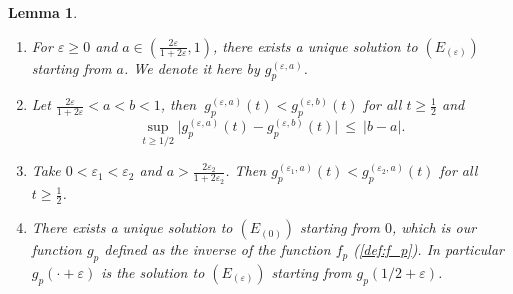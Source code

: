 \documentclass[a4, 11pt]{article}
\numberwithin{equation}{section}
\theoremstyle{plain}
\newtheorem{lemma}[theorem]{Lemma}
\theoremstyle{definition}
\theoremstyle{remark}
\begin{document}
\begin{lemma}\label{lm:equadiff}
\begin{enumerate}[topsep=0cm]
\item[\emph{1)}] For $\varepsilon \geq 0$ and $a\in \left(\frac{2\varepsilon}{1+2\varepsilon},1\right)$,  there exists a unique solution to $(E_{(\varepsilon)})$ starting from $a$. We denote it here by $g_p^{(\varepsilon,a)}$.
\item[\emph{2)}] Let $\frac{2\varepsilon}{1+2\varepsilon}<a<b<1$, then $~g_p^{(\varepsilon,a)}(t)<g_p^{(\varepsilon,b)}(t)$ for all $t \geq \frac{1}{2}$ and 
$$\sup_{t\geq {1}/{2}}\big\vert g_p^{(\varepsilon,a)}(t)-g_p^{(\varepsilon,b)}(t)\big\vert ~\leq ~\vert b-a\vert.$$

\vspace{-0.4cm}

\item[\emph{3)}] Take $0<\varepsilon_1<\varepsilon_2$ and $a>\frac{2\varepsilon_2}{1+2\varepsilon_2}$. Then $g^{(\varepsilon_1,a)}_{p}(t)< g^{(\varepsilon_2,a)}_{p}(t)$ for all $t\geq \frac{1}{2}$.
\item[\emph{4)}] There exists a unique solution to $(E_{(0)})$ starting from $0$, which is our function $g_p$ defined as the inverse of the function $f_p$ (\ref{def:f_p}). In particular $g_{p}(\cdot+\varepsilon)$ is the solution to $(E_{(\varepsilon)})$ starting from $g_{p}({1}/{2}+\varepsilon)$.
\end{enumerate}
\end{lemma}
\end{document}
